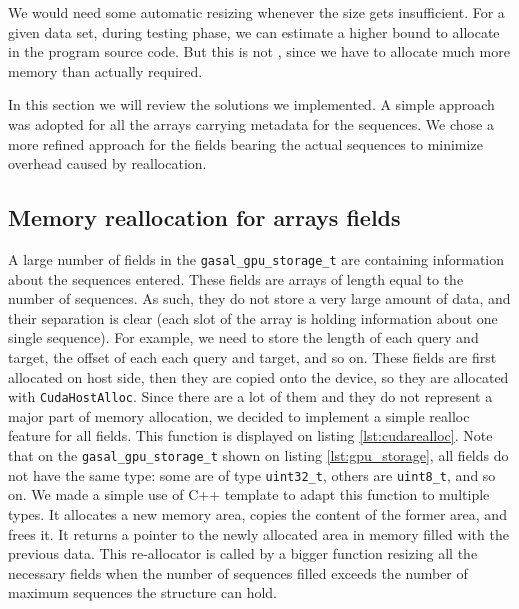 We would need some automatic resizing whenever the size gets insufficient.
For a given data set, during testing phase, we can estimate a higher bound to allocate in the program source code. But this is not , since we have to allocate much more memory than actually required.

In this section we will review the solutions we implemented. A simple approach was adopted for all the arrays carrying metadata for the sequences. We chose a more refined approach for the fields bearing the actual sequences to minimize overhead caused by reallocation.

\subsection{Memory reallocation for arrays fields}

A large number of fields in the \verb|gasal_gpu_storage_t| are containing information about the sequences entered. These fields are arrays of length equal to the number of sequences. As such, they do not store a very large amount of data, and their separation is clear (each slot of the array is holding information about one single sequence). For example, we need to store the length of each query and target, the offset of each each query and target, and so on. These fields are first allocated on host side, then they are copied onto the device, so they are allocated with \verb|CudaHostAlloc|. Since there are a lot of them and they do not represent a major part of memory allocation, we decided to implement a simple realloc feature for all fields. This function is displayed on listing \ref{lst:cudarealloc}. Note that on the \verb|gasal_gpu_storage_t| shown on listing \ref{lst:gpu_storage}, all fields do not have the same type: some are of type \verb|uint32_t|, others are \verb|uint8_t|, and so on. We made a simple use of C++ template to adapt this function to multiple types. It allocates a new memory area, copies the content of the former area, and frees it. It returns a pointer to the newly allocated area in memory filled with the previous data. This re-allocator is called by a bigger function resizing all the necessary fields when the number of sequences filled exceeds the number of maximum sequences the structure can hold.

